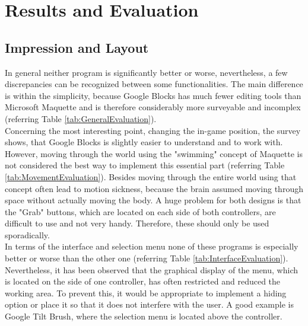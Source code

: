 \documentclass{report}
\begin{document}
	\section{Results and Evaluation}
	\startsection
		\vspace{0.1cm}
		\subsection{Impression and Layout}
		\startsubsection
			In general neither program is significantly better or worse, nevertheless, a few discrepancies can be recognized between some functionalities. The main difference is within the simplicity, because Google Blocks has much fewer editing tools than Microsoft Maquette and is therefore considerably more surveyable and incomplex (referring Table \ref{tab:GeneralEvaluation}). \\
			Concerning the most interesting point, changing the in-game position, the survey shows, that Google Blocks is slightly easier to understand and to work with. However, moving through the world using the "swimming" concept of Maquette is not considered the best way to implement this essential part (referring Table \ref{tab:MovementEvaluation}). Besides moving through the entire world using that concept often lead to motion sickness, because the brain assumed moving through space without actually moving the body. A huge problem for both designs is that the "Grab" buttons, which are located on each side of both controllers, are difficult to use and not very handy. Therefore, these should only be used sporadically. \\
			In terms of the interface and selection menu none of these programs is especially better or worse than the other one (referring Table \ref{tab:InterfaceEvaluation}). Nevertheless, it has been observed that the graphical display of the menu, which is located on the side of one controller, has often restricted and reduced the working area. To prevent this, it would be appropriate to implement a hiding option or place it so that it does not interfere with the user. A good example is Google Tilt Brush, where the selection menu is located above the controller.
		\closesection
\end{document}
